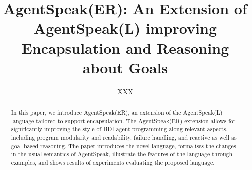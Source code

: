\documentclass{llncs}
\begin{document}
\title{AgentSpeak(ER): An Extension of AgentSpeak(L) improving
  Encapsulation and Reasoning about Goals}




\author{XXX}

\maketitle

\begin{abstract}  
  In this paper, we introduce AgentSpeak(ER), an extension of the
  AgentSpeak(L) language tailored to support encapsulation. The
  AgentSpeak(ER) extension allows for significantly improving the
  style of BDI agent programming along relevant aspects, including
  program modularity and readability, failure handling, and reactive
  as well as goal-based reasoning. The paper introduces the novel
  language, formalises the changes in the usual semantics of
  AgentSpeak, illustrate the features of the language through
  examples, and shows results of experiments evaluating the proposed
  language.
\end{abstract}








% 








\end{document}
